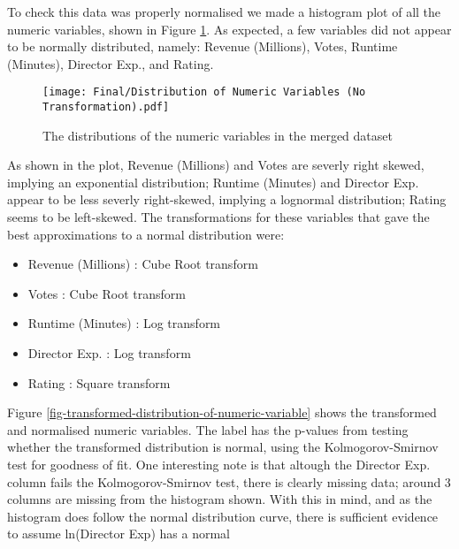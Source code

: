         To check this data was properly normalised we made a histogram plot of all the
            numeric variables, shown in Figure \ref{fig-distribution-of-numeric-variable}.
        As expected, a few variables did not appear to be normally distributed, namely:
        Revenue (Millions), Votes, Runtime (Minutes), Director Exp., and Rating.
        \begin{figure}[H]
            \centering
            \texttt{[image: Final/Distribution of Numeric Variables (No Transformation).pdf]}
            \caption[short]{The distributions of the numeric variables in the merged dataset}\label{fig-distribution-of-numeric-variable}
        \end{figure}
        As shown in the plot, Revenue (Millions) and Votes are severly right skewed,
            implying an exponential distribution; Runtime (Minutes) and Director Exp.
        appear to be less severly right-skewed, implying a lognormal distribution;
        Rating seems to be left-skewed.
        The transformations for these variables that gave the best approximations to a
            normal distribution were:
        \begin{multicols}{2}
            \begin{itemize}
                \item Revenue (Millions) : Cube Root transform
                \item Votes              : Cube Root transform
                \item Runtime (Minutes)  : Log transform
                \item Director Exp.      : Log transform
                \item Rating             : Square transform
            \end{itemize}
        \end{multicols}
        Figure \ref{fig-transformed-distribution-of-numeric-variable} shows the
            transformed and normalised numeric variables.
        The label has the p-values from testing whether the transformed distribution is
            normal, using the Kolmogorov-Smirnov test\cite{KStest} for goodness of fit.
        One interesting note is that altough the Director Exp.
        column fails the Kolmogorov-Smirnov test, there is clearly missing
        data; around 3 columns are missing from the histogram shown.
        With this in mind, and as the histogram does follow the normal distribution
            curve, there is sufficient evidence to assume ln(Director Exp) has a normal
